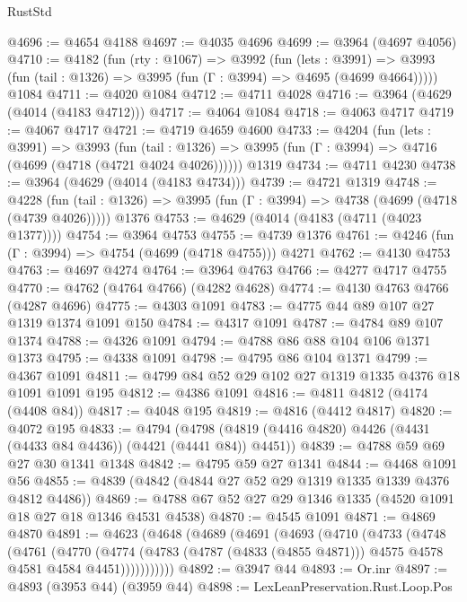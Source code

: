 \begin{lexlean}{RustStd}
\begin{coremodule}
@4696 := @4654 @4188
@4697 := @4035 @4696
@4699 := @3964 (@4697 @4056)
@4710 := @4182
    (fun (rty : @1067) =>
    @3992
      (fun (lets : @3991) =>
      @3993 (fun (tail : @1326) => @3995 (fun (Γ : @3994) => @4695 (@4699 @4664)))))
    @1084
@4711 := @4020 @1084
@4712 := @4711 @4028
@4716 := @3964 (@4629 (@4014 (@4183 @4712)))
@4717 := @4064 @1084
@4718 := @4063 @4717
@4719 := @4067 @4717
@4721 := @4719 @4659 @4600
@4733 := @4204
    (fun (lets : @3991) =>
    @3993
      (fun (tail : @1326) => @3995 (fun (Γ : @3994) => @4716 (@4699 (@4718 (@4721 @4024 @4026))))))
    @1319
@4734 := @4711 @4230
@4738 := @3964 (@4629 (@4014 (@4183 @4734)))
@4739 := @4721 @1319
@4748 := @4228
    (fun (tail : @1326) => @3995 (fun (Γ : @3994) => @4738 (@4699 (@4718 (@4739 @4026)))))
    @1376
@4753 := @4629 (@4014 (@4183 (@4711 (@4023 @1377))))
@4754 := @3964 @4753
@4755 := @4739 @1376
@4761 := @4246 (fun (Γ : @3994) => @4754 (@4699 (@4718 @4755))) @4271
@4762 := @4130 @4753
@4763 := @4697 @4274
@4764 := @3964 @4763
@4766 := @4277 @4717 @4755
@4770 := @4762 (@4764 @4766) (@4282 @4628)
@4774 := @4130 @4763 @4766 (@4287 @4696)
@4775 := @4303 @1091
@4783 := @4775 @44 @89 @107 @27 @1319 @1374 @1091 @150
@4784 := @4317 @1091
@4787 := @4784 @89 @107 @1374
@4788 := @4326 @1091
@4794 := @4788 @86 @88 @104 @106 @1371 @1373
@4795 := @4338 @1091
@4798 := @4795 @86 @104 @1371
@4799 := @4367 @1091
@4811 := @4799 @84 @52 @29 @102 @27 @1319 @1335 @4376 @18 @1091 @1091 @195
@4812 := @4386 @1091
@4816 := @4811 @4812 (@4174 (@4408 @84))
@4817 := @4048 @195
@4819 := @4816 (@4412 @4817)
@4820 := @4072 @195
@4833 := @4794
    (@4798 (@4819 (@4416 @4820) @4426 (@4431 (@4433 @84 @4436)) (@4421 (@4441 @84)) @4451))
@4839 := @4788 @59 @69 @27 @30 @1341 @1348
@4842 := @4795 @59 @27 @1341
@4844 := @4468 @1091 @56
@4855 := @4839 (@4842 (@4844 @27 @52 @29 @1319 @1335 @1339 @4376 @4812 @4486))
@4869 := @4788 @67 @52 @27 @29 @1346 @1335 (@4520 @1091 @18 @27 @18 @1346 @4531 @4538)
@4870 := @4545 @1091
@4871 := @4869 @4870
@4891 := @4623
    (@4648
      (@4689
        (@4691
          (@4693
            (@4710
              (@4733
                (@4748
                  (@4761
                    (@4770
                      (@4774
                        (@4783
                          (@4787 (@4833 (@4855 @4871)))
                          @4575
                          @4578
                          @4581
                          @4584
                          @4451)))))))))))
@4892 := @3947 @44
@4893 := Or.inr
@4897 := @4893 (@3953 @44) (@3959 @44)
@4898 := LexLeanPreservation.Rust.Loop.Pos

\end{coremodule}
\end{lexlean}
